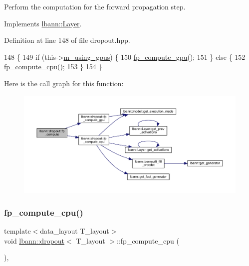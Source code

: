 Perform the computation for the forward propagation step. 

Implements \hyperlink{classlbann_1_1Layer_a523319dd1bd87a0612afa1912bb5aad7}{lbann\+::\+Layer}.



Definition at line 148 of file dropout.\+hpp.


\begin{DoxyCode}
148                               \{
149     \textcolor{keywordflow}{if} (this->\hyperlink{classlbann_1_1Layer_af7881cb5eff5207c15fa835d65462e8f}{m\_using\_gpus}) \{
150       \hyperlink{classlbann_1_1dropout_ad71de4282d2164171bbcad158a7bf1e7}{fp\_compute\_gpu}();
151     \} \textcolor{keywordflow}{else} \{
152       \hyperlink{classlbann_1_1dropout_a358c502d8e7eeb1fed8b5df468793b09}{fp\_compute\_cpu}();
153     \}
154   \}
\end{DoxyCode}
Here is the call graph for this function\+:\nopagebreak
\begin{figure}[H]
\begin{center}
\leavevmode
\includegraphics[width=350pt]{classlbann_1_1dropout_a9ed94f278835b6c9e8185de01705e53a_cgraph}
\end{center}
\end{figure}
\mbox{\label{classlbann_1_1dropout_a358c502d8e7eeb1fed8b5df468793b09}} 
\subsubsection{\texorpdfstring{fp\+\_\+compute\+\_\+cpu()}{fp\_compute\_cpu()}}
{\footnotesize\ttfamily template$<$data\+\_\+layout T\+\_\+layout$>$ \\
void \hyperlink{classlbann_1_1dropout}{lbann\+::dropout}$<$ T\+\_\+layout $>$\+::fp\+\_\+compute\+\_\+cpu (\begin{DoxyParamCaption}{ }\end{DoxyParamCaption})\hspace{0.3cm}{\ttfamily [inline]}, {\ttfamily [private]}}



